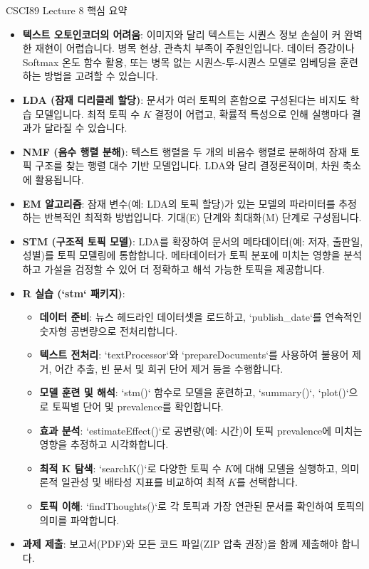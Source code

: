 \documentclass[11pt,a4paper]{article}
\begin{document}
\begin{keytakeaway}{CSCI89 Lecture 8 핵심 요약}
\begin{itemize}[noitemsep,topsep=0pt,parsep=0pt,partopsep=0pt]
    \item \textbf{텍스트 오토인코더의 어려움}: 이미지와 달리 텍스트는 시퀀스 정보 손실이 커 완벽한 재현이 어렵습니다. 병목 현상, 관측치 부족이 주원인입니다. 데이터 증강이나 Softmax 온도 함수 활용, 또는 병목 없는 시퀀스-투-시퀀스 모델로 임베딩을 훈련하는 방법을 고려할 수 있습니다.
    \item \textbf{LDA (잠재 디리클레 할당)}: 문서가 여러 토픽의 혼합으로 구성된다는 비지도 학습 모델입니다. 최적 토픽 수 $K$ 결정이 어렵고, 확률적 특성으로 인해 실행마다 결과가 달라질 수 있습니다.
    \item \textbf{NMF (음수 행렬 분해)}: 텍스트 행렬을 두 개의 비음수 행렬로 분해하여 잠재 토픽 구조를 찾는 행렬 대수 기반 모델입니다. LDA와 달리 결정론적이며, 차원 축소에 활용됩니다.
    \item \textbf{EM 알고리즘}: 잠재 변수(예: LDA의 토픽 할당)가 있는 모델의 파라미터를 추정하는 반복적인 최적화 방법입니다. 기대(E) 단계와 최대화(M) 단계로 구성됩니다.
    \item \textbf{STM (구조적 토픽 모델)}: LDA를 확장하여 문서의 메타데이터(예: 저자, 출판일, 성별)를 토픽 모델링에 통합합니다. 메타데이터가 토픽 분포에 미치는 영향을 분석하고 가설을 검정할 수 있어 더 정확하고 해석 가능한 토픽을 제공합니다.
    \item \textbf{R 실습 (`stm` 패키지)}:
    \begin{itemize}
        \item \textbf{데이터 준비}: 뉴스 헤드라인 데이터셋을 로드하고, `publish_date`를 연속적인 숫자형 공변량으로 전처리합니다.
        \item \textbf{텍스트 전처리}: `textProcessor`와 `prepareDocuments`를 사용하여 불용어 제거, 어간 추출, 빈 문서 및 희귀 단어 제거 등을 수행합니다.
        \item \textbf{모델 훈련 및 해석}: `stm()` 함수로 모델을 훈련하고, `summary()`, `plot()`으로 토픽별 단어 및 prevalence를 확인합니다.
        \item \textbf{효과 분석}: `estimateEffect()`로 공변량(예: 시간)이 토픽 prevalence에 미치는 영향을 추정하고 시각화합니다.
        \item \textbf{최적 K 탐색}: `searchK()`로 다양한 토픽 수 $K$에 대해 모델을 실행하고, 의미론적 일관성 및 배타성 지표를 비교하여 최적 $K$를 선택합니다.
        \item \textbf{토픽 이해}: `findThoughts()`로 각 토픽과 가장 연관된 문서를 확인하여 토픽의 의미를 파악합니다.
    \end{itemize}
    \item \textbf{과제 제출}: 보고서(PDF)와 모든 코드 파일(ZIP 압축 권장)을 함께 제출해야 합니다.
\end{itemize}
\end{keytakeaway}
\end{document}

